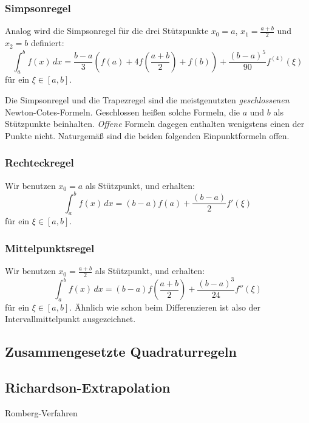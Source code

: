 \subsubsection{Simpsonregel}

Analog wird die Simpsonregel für die drei Stützpunkte $x_0=a$,
$x_1=\frac{a+b}{2}$ und $x_2=b$ definiert:
\begin{equation}
  \int_a^b f(x)\, dx = \frac{b-a}{3} \left(f(a) +
  4 f\left(\frac{a+b}{2}\right) + f(b)\right) +
  \frac{(b-a)^5}{90} f^{(4)}(\xi)
\end{equation}
für ein $\xi\in[a,b]$.


Die Simpsonregel und die Trapezregel sind die meistgenutzten
\emph{geschlossenen} Newton-Cotes-Formeln. Geschlossen heißen solche
Formeln, die $a$ und $b$ als Stützpunkte beinhalten. \emph{Offene}
Formeln dagegen enthalten wenigstens einen der Punkte
nicht. Naturgemäß sind die beiden folgenden Einpunktformeln offen.

\subsubsection{Rechteckregel}

Wir benutzen $x_0=a$ als Stützpunkt, und erhalten:
\begin{equation}
  \int_a^b f(x)\, dx = (b-a) f(a) +
  \frac{(b-a)}{2} f'(\xi)
\end{equation}
für ein $\xi\in[a,b]$.

\subsubsection{Mittelpunktsregel}

Wir benutzen $x_0=\frac{a+b}{2}$ als Stützpunkt, und erhalten:
\begin{equation}
  \int_a^b f(x)\, dx = (b-a) f(\frac{a+b}{2}) +
  \frac{(b-a)^3}{24} f''(\xi)
\end{equation}
für ein $\xi\in[a,b]$. Ähnlich wie schon beim Differenzieren ist also
der Intervallmittelpunkt ausgezeichnet.

\subsection{Zusammengesetzte Quadraturregeln}


\subsection{Richardson-Extrapolation}
Romberg-Verfahren

